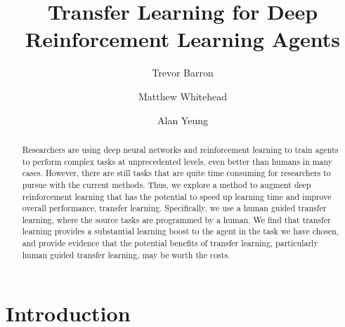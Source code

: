 \documentclass{llncs}
\begin{document}
%
%

%
%
\title{Transfer Learning for Deep Reinforcement Learning Agents}
%
%
\author{Trevor Barron \and Matthew Whitehead \and Alan Yeung}
%
%
%

\maketitle              %

\begin{abstract}
Researchers are using deep neural networks and reinforcement learning to train agents to perform complex tasks at unprecedented levels, even better than humans in many cases. 
However, there are still tasks that are quite time consuming for researchers to pursue with the current methods. 
Thus, we explore a method to augment deep reinforcement learning that has the potential to speed up learning time and improve overall performance, transfer learning. 
Specifically, we use a human guided transfer learning, where the source tasks are programmed by a human. 
We find that transfer learning provides a substantial learning boost to the agent in the task we have chosen, and provide evidence that the potential benefits of transfer learning, particularly human guided transfer learning, may be worth the costs. 
\end{abstract}
%

\section{Introduction}
\end{document}
